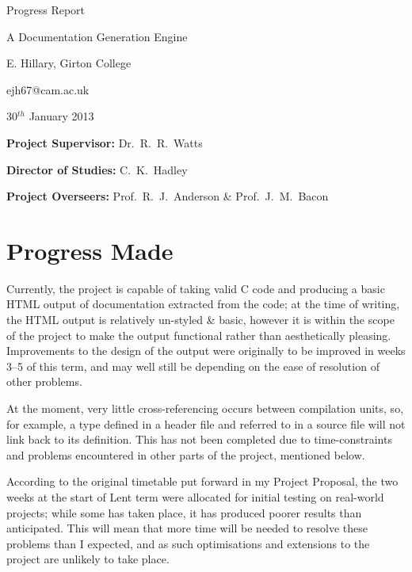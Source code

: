 \documentclass[10pt,oneside,a4paper]{article}
\begin{document}
\vfil

\centerline{\Large Progress Report}
\vspace{0.4in}
\centerline{\Large A Documentation Generation Engine }
\vspace{0.4in}
\centerline{\large E. Hillary, Girton College}
\vspace{0.3in}
\centerline{\large ejh67@cam.ac.uk}
\vspace{0.3in}
\centerline{\large 30$^{th}$ January 2013}

\vfil


\noindent
{\bf Project Supervisor:} Dr.~R.~R.~Watts
\vspace{0.2in}

\noindent
{\bf Director of Studies:} C.~K.~Hadley
\vspace{0.2in}
\noindent

\noindent
{\bf Project Overseers:} Prof.~R.~J.~Anderson  \& Prof.~J.~M.~Bacon

\vfil
\newpage

\section*{Progress Made}
Currently, the project is capable of taking valid C code and producing a basic
HTML output of documentation extracted from the code; at the time of writing,
the HTML output is relatively un-styled \& basic, however it is within the scope
of the project to make the output functional rather than aesthetically pleasing.
Improvements to the design of the output were originally to be improved in weeks
3--5 of this term, and may well still be depending on the ease of resolution of
other problems.

At the moment, very little cross-referencing occurs between compilation units,
so, for example, a type defined in a header file and referred to in a source
file will not link back to its definition. This has not been completed due to
time-constraints and problems encountered in other parts of the project,
mentioned below.

According to the original timetable put forward in my Project Proposal, the two
weeks at the start of Lent term were allocated for initial testing on real-world
projects; while some has taken place, it has produced poorer results than
anticipated. This will mean that more time will be needed to resolve these
problems than I expected, and as such optimisations and extensions to the
project are unlikely to take place.
\end{document}
